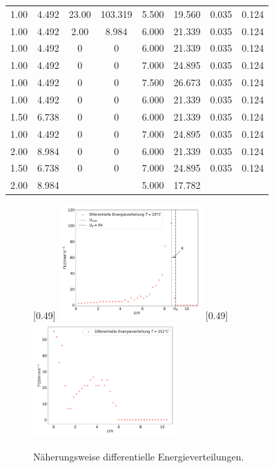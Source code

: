 \begin{table}
\begin{tabular}{S S | S S || S S | S S}
    1.00 & 4.492 & 23.00 & 103.319 & 5.500 & 19.560 & 0.035 & 0.124 \\
    1.00 & 4.492 & 2.00 & 8.984 & 6.000 & 21.339 & 0.035 & 0.124 \\
    1.00 & 4.492 & 0 & 0 & 6.000 & 21.339 & 0.035 & 0.124 \\
    1.00 & 4.492 & 0 & 0 & 7.000 & 24.895 & 0.035 & 0.124 \\
    1.00 & 4.492 & 0 & 0 & 7.500 & 26.673 & 0.035 & 0.124 \\
    1.00 & 4.492 & 0 & 0 & 6.000 & 21.339 & 0.035 & 0.124 \\
    1.50 & 6.738 & 0 & 0 & 6.000 & 21.339 & 0.035 & 0.124 \\
    1.00 & 4.492 & 0 & 0 & 7.000 & 24.895 & 0.035 & 0.124 \\
    2.00 & 8.984 & 0 & 0 & 6.000 & 21.339 & 0.035 & 0.124 \\
    1.50 & 6.738 & 0 & 0 & 7.000 & 24.895 & 0.035 & 0.124 \\
    2.00 & 8.984 &  &  & 5.000 & 17.782 &  &  \\
    \bottomrule
  \end{tabular}
\end{table}
\begin{figure}
  \centering
  [0.49\textwidth]{
    \includegraphics[width=0.49\textwidth]{T20.pdf}
    }
  \hfill
  [0.49\textwidth]{
    \includegraphics[width=0.49\textwidth]{T152.pdf}
    }
  \hfill
  \caption{Näherungsweise differentielle Energieverteilungen.}
\end{figure}
